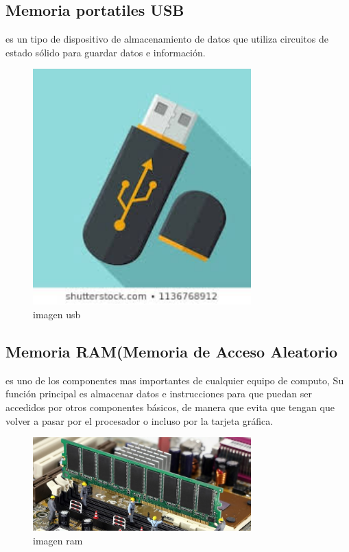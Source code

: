 \documentclass{article}
\begin{document}
\subsection*{Memoria portatiles USB}
es un tipo de dispositivo de almacenamiento de datos que utiliza circuitos de estado sólido para guardar datos e información.
\begin{figure}[h!]
    \centering
    \includegraphics[width=0.75\textwidth]{usb.jpg}
    \caption{imagen usb}
    \label{fig:my_label}
\end{figure}
\subsection*{Memoria RAM(Memoria de Acceso Aleatorio}
es uno de los componentes mas importantes de cualquier equipo de computo, Su función principal es almacenar datos e instrucciones para que puedan ser accedidos por otros componentes básicos, de manera que evita que tengan que volver a pasar por el procesador o incluso por la tarjeta gráfica.
\begin{figure}[h!]
    \centering
    \includegraphics[width=0.75\textwidth]{ram.jpg}
    \caption{imagen ram}
    \label{fig:my_label}
\end{figure}
\end{document}
